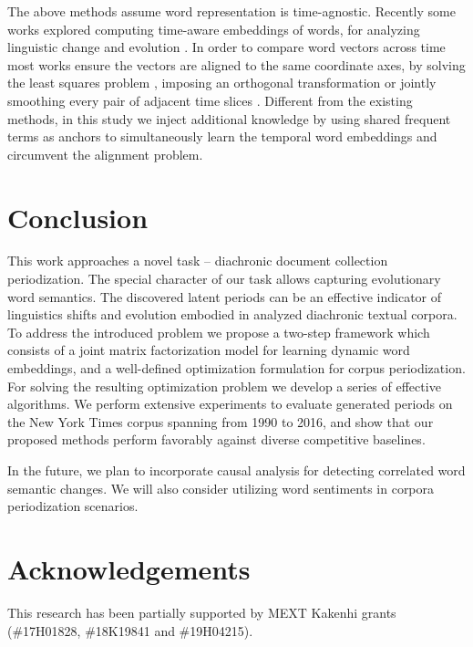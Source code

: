 \documentclass[output=paper]{langsci/langscibook}
\begin{document}
The above methods assume word representation is time-agnostic. Recently some works explored computing time-aware embeddings of words, for analyzing linguistic change and evolution \citep{yao2018dynamic,zhang-etal-2015-omnia,hamilton-etal-2016-diachronic,kulkarni2015statistically,wordsaremalleable,gonen2020simple}. In order to compare word vectors across time most works ensure the vectors are aligned to the same coordinate axes, by solving the least squares problem \citep{zhang-etal-2015-omnia,kulkarni2015statistically}, imposing an orthogonal transformation \citep{hamilton-etal-2016-diachronic} or jointly smoothing every pair of adjacent time slices \citep{yao2018dynamic}. Different from the existing methods, in this study we inject additional knowledge by using shared frequent terms as anchors to simultaneously learn the temporal word embeddings and circumvent the alignment problem.

\section{Conclusion}
This work approaches a novel task -- diachronic document collection periodization. The special character of our task allows capturing evolutionary word semantics.
The discovered latent periods can be an effective indicator of linguistics shifts and evolution embodied in analyzed diachronic textual corpora. To address the introduced problem we propose a two-step framework which consists of 
a joint matrix factorization model for learning dynamic word embeddings, and a well-defined optimization formulation for corpus periodization.
For solving the resulting optimization problem we develop a series of effective algorithms. We perform extensive experiments to evaluate generated periods on the New York Times corpus spanning from 1990 to 2016, and show that our proposed methods perform favorably against diverse competitive baselines.

In the future, we plan to incorporate causal analysis for detecting correlated word semantic changes. We will also consider utilizing word sentiments in corpora periodization scenarios.

\section*{Acknowledgements}
This research has been partially supported by MEXT Kakenhi grants (\#17H01828, \#18K19841 and \#19H04215).
\end{document}
